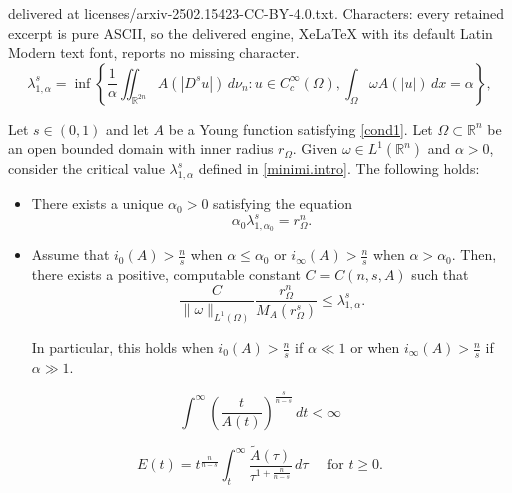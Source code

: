 \documentclass[10pt,a4paper]{amsart}
\begin{document}
delivered at licenses/arxiv-2502.15423-CC-BY-4.0.txt. Characters: every retained excerpt is pure ASCII, so the delivered engine, XeLaTeX with its default Latin Modern text font, reports no missing character.
\begin{equation} \label{minimi.intro}
\lambda_{1,\alpha}^s = \inf\left\{\frac{1}{\alpha}\iint_{\mathbb{R}^{2n}} A(|D^s  u|)\, d\nu_n \colon u\in C_c^\infty(\Omega), \int_\Omega  \omega A(|u|)\, dx = \alpha\right\},
\end{equation}

\begin{thm}  \label{teo1.intro}
Let $s\in (0,1)$ and let $A$ be a Young function satisfying \eqref{cond1}. Let $\Omega\subset \mathbb{R}^n$ be an open bounded domain with inner radius $r_\Omega$. Given  $\omega\in L^1(\mathbb{R}^n)$ and $\alpha>0$, consider the critical value $\lambda_{1,\alpha}^s$ defined in \eqref{minimi.intro}. The following holds:
\begin{itemize}
\item[i)] There exists a unique $\alpha_0>0$ satisfying the equation
$$
\alpha_0 \lambda_{1,\alpha_0}^s = r_\Omega^n.
$$

\item[ii)] 
Assume that $i_0(A)>\frac{n}{s}$ when $\alpha\leq \alpha_0$ or $i_\infty(A) >\frac{n}{s}$ when $\alpha> \alpha_0$. Then, there exists a positive, computable constant $C=C(n,s,A)$ such that
\begin{equation*} %
\frac{C}{\|\omega\|_{L^1(\Omega)}} \frac{r_\Omega^n}{M_A(r_\Omega^s)} \le \lambda_{1,\alpha}^s.
\end{equation*}


\noindent In particular, this holds when $i_0(A)>\frac{n}{s}$ if $\alpha\ll1$ or when $i_\infty(A) >\frac{n}{s}$ if $\alpha\gg1$.
\end{itemize}

\end{thm}

\begin{equation} \label{cond1}
\int^\infty \left(\frac{t}{A(t)}\right)^\frac{s}{n-s}\,dt<\infty
\end{equation}

\begin{equation} \label{func.e}
E(t)=t^\frac{n}{n-s}\int_t^\infty \frac{\tilde A(\tau)}{\tau^{1+\frac{n}{n-s}}}\,d\tau\quad \text{ for } t\geq 0.
\end{equation}
\end{document}
